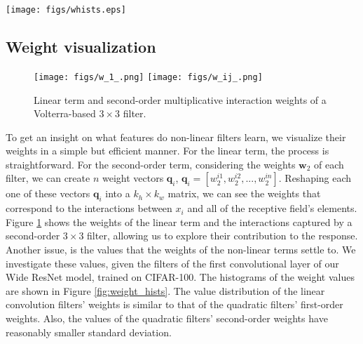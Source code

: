 \documentclass[10pt,twocolumn,letterpaper]{article}
\renewcommand{\vec}[1]{\mathbf{#1}}
\begin{document}




\begin{figure*}[!ht]
  \centering
  \texttt{[image: figs/whists.eps]}
\caption{Weight values of linear convolution filter weights (left), Volterra-based convolution first-order weights (middle) and Volterra-based convolution second-order weights (right).}
\label{fig:weight_hists}
\end{figure*}


\subsection{Weight visualization}
\begin{figure}[!hb]
\hspace{-0.41cm}
\centering
  \texttt{[image: figs/w\_1\_.png]}
\endminipage\hfill
{}
  \texttt{[image: figs/w\_ij\_.png]}
\endminipage
\caption{Linear term and second-order multiplicative interaction weights of a Volterra-based $3\times3$ filter.}\label{fig:Volt_kern_vis}
\end{figure}	  
    To get an insight on what features do non-linear filters learn, we visualize their weights in a simple but efficient manner. For the linear term, the process is straightforward. For the second-order term, considering the weights $\vec{w}_2$ of each filter, we can create $n$ weight vectors $\vec{q}_i$, $\vec{q}_i=[w_2^{i1}, w_2^{i2}, ..., w_2^{in}]$. Reshaping each one of these vectors $\vec{q}_i$ into a $k_h \times k_w$ matrix, we can see the weights that correspond to the interactions between $x_i$ and all of the receptive field's elements. Figure \ref{fig:Volt_kern_vis} shows the weights of the linear term and the interactions captured by a second-order $3\times3$ filter, allowing us to explore their contribution to the response.
    Another issue, is the values that the weights of the non-linear terms settle to. We investigate these values, given the filters of the first convolutional layer of our Wide ResNet model, trained on CIFAR-100. The histograms of the weight values are shown in Figure \ref{fig:weight_hists}. The value distribution of the linear convolution filters' weights is similar to that of the quadratic filters' first-order weights. Also, the values of the quadratic filters' second-order weights have reasonably smaller standard deviation. 
\end{document}
